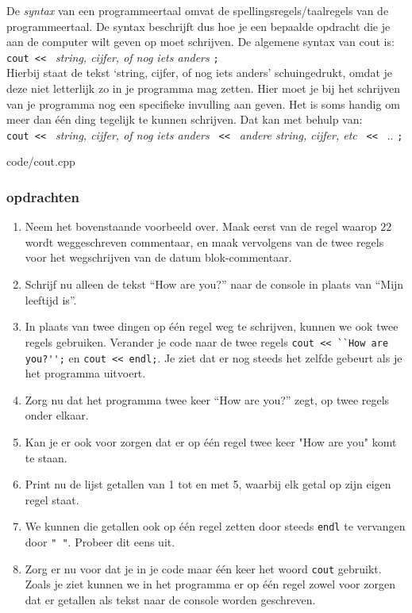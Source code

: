 \documentclass[12pt,a4paper]{article}
\newcommand{\code}{}
\newcommand{\icode}{\lstinline}
\begin{document}
De \emph{syntax} van een programmeertaal omvat de spellingsregels/taalregels van de programmeertaal. De syntax beschrijft dus hoe je een bepaalde opdracht die je aan de computer wilt geven op moet schrijven. De algemene syntax van cout is:\\

\icode{cout << } \emph{string, cijfer, of nog iets anders} \icode{;}\\

Hierbij staat de tekst `string, cijfer, of nog iets anders' schuingedrukt, omdat je deze niet letterlijk zo in je programma mag zetten. Hier moet je bij het schrijven van je programma nog een specifieke invulling aan geven. Het is soms handig om meer dan \'e\'en ding tegelijk te kunnen schrijven. Dat kan met behulp van:\\

\icode{cout << } \emph{string, cijfer, of nog iets anders} \icode{ << } \emph{andere string, cijfer, etc} \icode{ << } .. \icode{;}

\code{code/cout.cpp}

\subsubsection{opdrachten}
\begin{enumerate}
		\item
			Neem het bovenstaande voorbeeld over. Maak eerst van de regel waarop $22$ wordt weggeschreven commentaar, en maak vervolgens van de twee regels voor het wegschrijven van de datum blok-commentaar.
		\item
			Schrijf nu alleen de tekst ``How are you?'' naar de console in plaats van ``Mijn leeftijd is''.
		\item
			In plaats van twee dingen op \'e\'en regel weg te schrijven, kunnen we ook twee regels gebruiken. Verander je code naar de twee regels \icode{cout << ``How are you?'';} en \icode{cout << endl;}. Je ziet dat er nog steeds het zelfde gebeurt als je het programma uitvoert.
		\item
			Zorg nu dat het programma twee keer ``How are you?'' zegt, op twee regels onder elkaar.
		\item
			Kan je er ook voor zorgen dat er op \'e\'en regel twee keer "How are you" komt te staan.
		\item
			Print nu de lijst getallen van 1 tot en met 5, waarbij elk getal op zijn eigen regel staat.
		\item
			We kunnen die getallen ook op \'e\'en regel zetten door steeds \icode{endl} te vervangen door \icode{" "}. Probeer dit eens uit.
		\item
			Zorg er nu voor dat je in je code maar \'e\'en keer het woord \icode{cout} gebruikt.
			Zoals je ziet kunnen we in het programma er op \'e\'en regel zowel voor zorgen dat er getallen als tekst naar de console worden geschreven. 
\end{enumerate}
\end{document}
